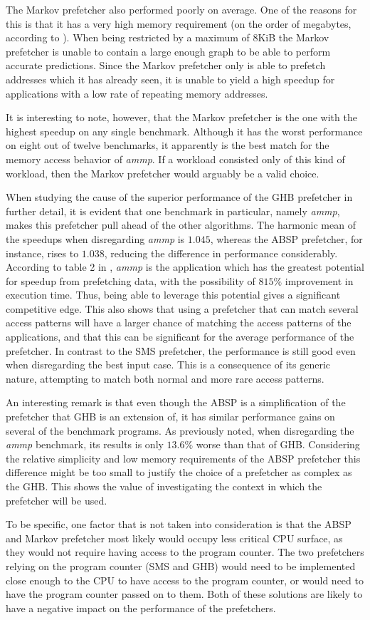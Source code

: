 The Markov prefetcher also performed poorly on average. One of the
reasons for this is that it has a very high memory requirement (on the
order of megabytes, according to \cite{Nesbit}). When being restricted
by a maximum of 8KiB the Markov prefetcher is unable to contain a
large enough graph to be able to perform accurate predictions. Since
the Markov prefetcher only is able to prefetch addresses which it has
already seen, it is unable to yield a high speedup for applications
with a low rate of repeating memory addresses.

It is interesting to note, however, that the Markov prefetcher is the
one with the highest speedup on any single benchmark. Although it has
the worst performance on eight out of twelve benchmarks, it apparently
is the best match for the memory access behavior of \emph{ammp}. If a
workload consisted only of this kind of workload, then the Markov
prefetcher would arguably be a valid choice.

When studying the cause of the superior performance of the GHB
prefetcher in further detail, it is evident that one benchmark in
particular, namely \emph{ammp}, makes this prefetcher pull ahead of
the other algorithms. The harmonic mean of the speedups when
disregarding \emph{ammp} is $1.045$, whereas the ABSP prefetcher, for
instance, rises to $1.038$, reducing the difference in performance
considerably. According to table 2 in \cite{Nesbit}, \emph{ammp} is
the application which has the greatest potential for speedup from
prefetching data, with the possibility of $815\%$ improvement in
execution time. Thus, being able to leverage this potential gives a
significant competitive edge. This also shows that using a prefetcher
that can match several access patterns will have a larger chance of
matching the access patterns of the applications, and that this can be
significant for the average performance of the prefetcher. In contrast
to the SMS prefetcher, the performance is still good even when
disregarding the best input case. This is a consequence of its generic
nature, attempting to match both normal and more rare access patterns.

An interesting remark is that even though the ABSP is a simplification
of the prefetcher that GHB is an extension of, it has similar
performance gains on several of the benchmark programs. As previously
noted, when disregarding the \emph{ammp} benchmark, its results is
only $13.6\%$ worse than that of GHB. Considering the relative
simplicity and low memory requirements of the ABSP prefetcher this
difference might be too small to justify the choice of a prefetcher as
complex as the GHB. This shows the value of investigating the context
in which the prefetcher will be used.

To be specific, one factor that is not taken into consideration is
that the ABSP and Markov prefetcher most likely would occupy less
critical CPU surface, as they would not require having access to the
program counter. The two prefetchers relying on the program counter
(SMS and GHB) would need to be implemented close enough to the CPU to
have access to the program counter, or would need to have the program
counter passed on to them. Both of these solutions are likely to have
a negative impact on the performance of the prefetchers.

